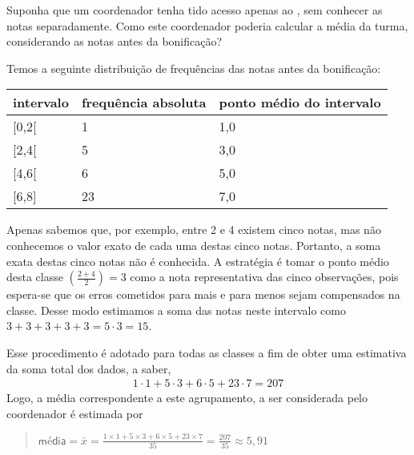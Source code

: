 Suponha que um coordenador tenha tido acesso apenas ao {\hyperref[\detokenize{PE104-0:fig-histograma-notas-sem-bonificacao}]{}}, sem conhecer as notas separadamente.  Como este coordenador poderia calcular a média da turma, considerando as notas antes da bonificação?

Temos a seguinte distribuição de frequências das notas antes da bonificação:


\begin{savenotes}\sphinxattablestart
\centering
{}
\label{\detokenize{PE104-1:id7}}
\sphinxaftercaption
\begin{tabulary}{\linewidth}[t]{|T|T|T|}
\hline

intervalo
&
frequência absoluta
&
ponto médio do intervalo
\\
\hline
{[}0,2{[}
&
1
&
1,0
\\
\hline
{[}2,4{[}
&
5
&
3,0
\\
\hline
{[}4,6{[}
&
6
&
5,0
\\
\hline
{[}6,8{]}
&
23
&
7,0
\\
\hline
\end{tabulary}
\par
\sphinxattableend\end{savenotes}

Apenas sabemos que, por exemplo, entre 2 e 4 existem cinco notas, mas  não conhecemos o valor exato de cada uma destas cinco notas. Portanto, a soma exata destas cinco notas não é conhecida. A estratégia é tomar o ponto médio desta classe \(\left (\frac{2+4}{2}\right )=3\) como a nota representativa das cinco observações, pois espera-se que os erros cometidos para mais e para menos sejam compensados na classe. Desse modo estimamos a soma das notas neste intervalo como \(3+3+3+3+3=5\cdot 3=15\).

Esse procedimento é adotado para todas as classes a fim de obter uma estimativa da soma total dos dados, a saber,
\begin{equation*}
\begin{split}1\cdot 1+5\cdot 3+6\cdot 5+23\cdot 7=207\end{split}
\end{equation*}
Logo, a média correspondente a este agrupamento, a ser considerada pelo coordenador é estimada por
\begin{quote}

\(\textsf{média}=\bar{x}=\frac{1\times 1+5\times 3+6\times 5+23\times 7}{35}=\frac{207}{35}\approx 5,91\)
\end{quote}

